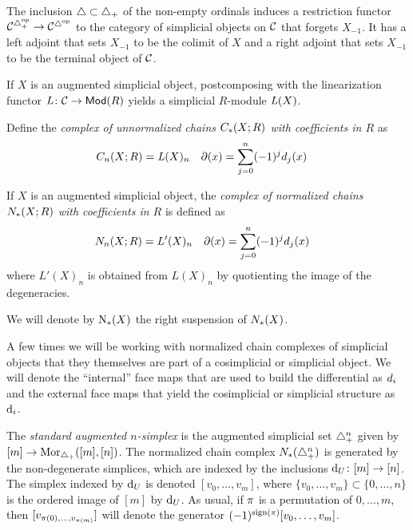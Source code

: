 The inclusion $\simplex \subset \asimplex$ of the non-empty ordinals induces a restriction functor $\cC^{\asimplex^{\op}} \to \cC^{\simplex^{\op}}$ to the category of simplicial objects on $\cC$ that forgets $X_{-1}$. It has a left adjoint that sets $X_{-1}$ to be the colimit of $X$ and a right adjoint that sets $X_{-1}$ to be the terminal object of $\cC$.

If $X$ is an augmented simplicial object, postcomposing with the linearization functor $\abel \colon \cC \to \Mod{R}$ yields a simplicial $R$-module $\abel(X)$.

Define the \emph{complex of unnormalized chains $\ucadenas(X;R)$ with coefficients in $R$} as
\begin{align*}
	\ucadenas[n](X;R) &= \abel(X)_n
	&
	\partial(x) &= \sum_{j=0}^{n} (-1)^jd_j(x)
\end{align*}

If $X$ is an augmented simplicial object, the \emph{complex of normalized chains $\cadenas(X;R)$ with coefficients in $R$} is defined as
\begin{align*}
	\cadenas[n](X;R) &= L'(X)_n
	&
	\partial(x) &= \sum_{j=0}^{n} (-1)^jd_j(x)
\end{align*}
where $L'(X)_n$ is obtained from $L(X)_n$ by quotienting the image of the degeneracies.

\begin{notation}\label{notation:chains}
	We will denote by $\chains(X)$ the right suspension of $\cadenas(X)$.
\end{notation}

\begin{notation}
	A few times we will be working with normalized chain complexes of simplicial objects that they themselves are part of a cosimplicial or simplicial object. We will denote the ``internal'' face maps that are used to build the differential as $\diff_i$ and the external face maps that yield the cosimplicial or simplicial structure as $\d_i$.
\end{notation}

The \emph{standard augmented $n$-simplex} is the augmented simplicial set $\simplex^n_+$ given by $[m] \to \mathrm{Mor}_{\asimplex}([m],[n])$. The normalized chain complex $\cadenas(\asimplex^n)$ is generated by the non-degenerate simplices, which are indexed by the inclusions $\d_U \colon [m] \to [n]$. The simplex indexed by $\d_U$ is denoted $[v_0,\dots,v_{m}]$, where $\{v_0,\dots,v_{m}\} \subset \{0,\dots,n\}$ is the ordered image of $[m]$ by $\d_U$. As usual, if $\perm$ is a permutation of $0,\dots,m$, then $[v_{\perm(0),\dots,v_{\perm(m)}}]$ will denote the generator $(-1)^{\sign{\perm}}[v_0,\dots,v_m]$.

